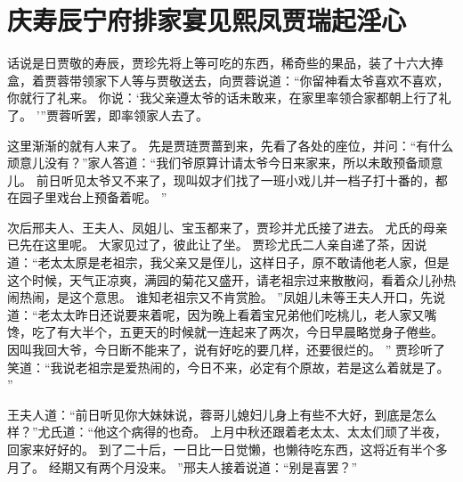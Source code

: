 \chapter{庆寿辰宁府排家宴\quad 见熙凤贾瑞起淫心}
\par
话说是日贾敬的寿辰，贾珍先将上等可吃的东西，稀奇些的果品，装了十六大捧盒，着贾蓉带领家下人等与贾敬送去，向贾蓉说道：“你留神看太爷喜欢不喜欢，你就行了礼来。
你说：‘我父亲遵太爷的话未敢来，在家里率领合家都朝上行了礼了。
’”贾蓉听罢，即率领家人去了。
\par
这里渐渐的就有人来了。
先是贾琏贾蔷到来，先看了各处的座位，并问：“有什么顽意儿没有？”家人答道：“我们爷原算计请太爷今日来家来，所以未敢预备顽意儿。
前日听见太爷又不来了，现叫奴才们找了一班小戏儿并一档子打十番的，都在园子里戏台上预备着呢。
”\par
次后邢夫人、王夫人、凤姐儿、宝玉都来了，贾珍并尤氏接了进去。
尤氏的母亲已先在这里呢。
大家见过了，彼此让了坐。
贾珍尤氏二人亲自递了茶，因说道：“老太太原是老祖宗，我父亲又是侄儿，这样日子，原不敢请他老人家，但是这个时候，天气正凉爽，满园的菊花又盛开，请老祖宗过来散散闷，看着众儿孙热闹热闹，是这个意思。
谁知老祖宗又不肯赏脸。
”凤姐儿未等王夫人开口，先说道：“老太太昨日还说要来着呢，因为晚上看着宝兄弟他们吃桃儿，老人家又嘴馋，吃了有大半个，五更天的时候就一连起来了两次，今日早晨略觉身子倦些。
因叫我回大爷，今日断不能来了，说有好吃的要几样，还要很烂的。
”
贾珍听了笑道：“我说老祖宗是爱热闹的，今日不来，必定有个原故，若是这么着就是了。
”\par
王夫人道：“前日听见你大妹妹说，蓉哥儿媳妇儿身上有些不大好，到底是怎么样？”尤氏道：“他这个病得的也奇。
上月中秋还跟着老太太、太太们顽了半夜，回家来好好的。
到了二十后，一日比一日觉懒，也懒待吃东西，这将近有半个多月了。
经期又有两个月没来。
”邢夫人接着说道：“别是喜罢？”\par
